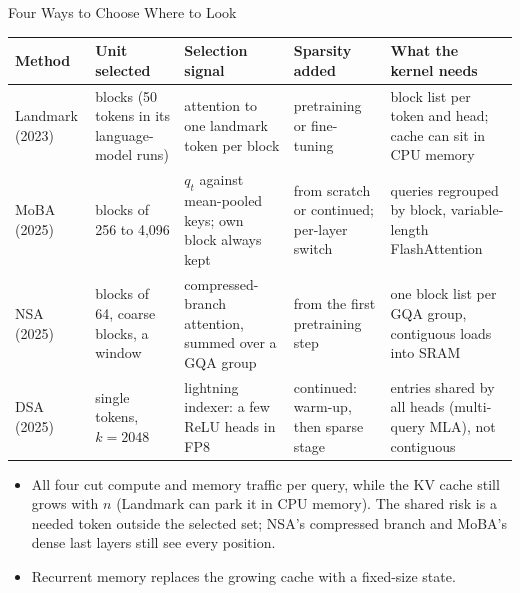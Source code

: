\begin{frame}{Four Ways to Choose Where to Look}
  \centering
  {\scriptsize
  \begin{tabular}{>{\raggedright\arraybackslash}p{1.35cm} >{\raggedright\arraybackslash}p{2.0cm} >{\raggedright\arraybackslash}p{2.7cm} >{\raggedright\arraybackslash}p{2.35cm} >{\raggedright\arraybackslash}p{3.1cm}}
    \toprule
    \textbf{Method} & \textbf{Unit selected} & \textbf{Selection signal} & \textbf{Sparsity added} & \textbf{What the kernel needs} \\
    \midrule
    Landmark (2023) & blocks (50 tokens in its language-model runs) & attention to one landmark token per block & pretraining or fine-tuning & block list per token and head; cache can sit in CPU memory \\
    \addlinespace[0.15em]
    MoBA (2025) & blocks of 256 to 4,096 & $q_t$ against mean-pooled keys; own block always kept & from scratch or continued; per-layer switch & queries regrouped by block, variable-length FlashAttention \\
    \addlinespace[0.15em]
    NSA (2025) & blocks of 64, coarse blocks, a window & compressed-branch attention, summed over a GQA group & from the first pretraining step & one block list per GQA group, contiguous loads into SRAM \\
    \addlinespace[0.15em]
    DSA (2025) & single tokens, $k = 2048$ & lightning indexer: a few ReLU heads in FP8 & continued: warm-up, then sparse stage & entries shared by all heads (multi-query MLA), not contiguous \\
    \bottomrule
  \end{tabular}\par}
  \vspace{0.6em}
  \begin{itemize}\footnotesize\itemsep0.3em
    \item[\textcolor{red}{$\blacktriangleright$}] All four cut compute and memory traffic per query, while the KV cache still grows with $n$ (Landmark can park it in CPU memory). The shared risk is a needed token outside the selected set; NSA's compressed branch and MoBA's dense last layers still see every position.
    \item[\textcolor{red}{$\blacktriangleright$}] Recurrent memory replaces the growing cache with a fixed-size state.
  \end{itemize}
\end{frame}
